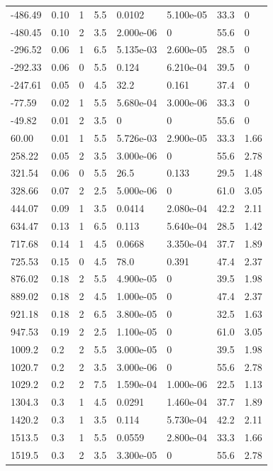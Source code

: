 \documentclass[preview]{standalone}
\begin{document}
{{\begin{tabular}{L{1.2cm}C{1.2cm} C{0.3cm}C{0.5cm} C{1.4cm}C{1.4cm} C{1.4cm}C{1.4cm}}
  -486.49  &  0.10  & 1     & 5.5 &  0.0102  & 5.100e-05  & 33.3 &  0   \\ 
  -480.45  &  0.10  & 2     & 3.5 &  2.000e-06  & 0  & 55.6 &  0   \\ 
  -296.52  &  0.06  & 1     & 6.5 &  5.135e-03  & 2.600e-05  & 28.5 &  0   \\ 
  -292.33  &  0.06  & 0     & 5.5 &  0.124  & 6.210e-04  & 39.5 &  0   \\ 
  -247.61  &  0.05  & 0     & 4.5 &  32.2  & 0.161  & 37.4 &  0   \\ 
  -77.59  &  0.02  & 1     & 5.5 &  5.680e-04  & 3.000e-06  & 33.3 &  0   \\ 
  -49.82  &  0.01  & 2     & 3.5 &  0  & 0  & 55.6 &  0   \\ 
  60.00  &  0.01  & 1     & 5.5 &  5.726e-03  & 2.900e-05  & 33.3 &  1.66   \\ 
  258.22  &  0.05  & 2     & 3.5 &  3.000e-06  & 0  & 55.6 &  2.78   \\ 
  321.54  &  0.06  & 0     & 5.5 &  26.5  & 0.133  & 29.5 &  1.48   \\ 
  328.66  &  0.07  & 2     & 2.5 &  5.000e-06  & 0  & 61.0 &  3.05   \\ 
  444.07  &  0.09  & 1     & 3.5 &  0.0414  & 2.080e-04  & 42.2 &  2.11   \\ 
  634.47  &  0.13  & 1     & 6.5 &  0.113  & 5.640e-04  & 28.5 &  1.42   \\ 
  717.68  &  0.14  & 1     & 4.5 &  0.0668  & 3.350e-04  & 37.7 &  1.89   \\ 
  725.53  &  0.15  & 0     & 4.5 &  78.0  & 0.391  & 47.4 &  2.37   \\ 
  876.02  &  0.18  & 2     & 5.5 &  4.900e-05  & 0  & 39.5 &  1.98   \\ 
  889.02  &  0.18  & 2     & 4.5 &  1.000e-05  & 0  & 47.4 &  2.37   \\ 
  921.18  &  0.18  & 2     & 6.5 &  3.800e-05  & 0  & 32.5 &  1.63   \\ 
  947.53  &  0.19  & 2     & 2.5 &  1.100e-05  & 0  & 61.0 &  3.05   \\ 
  1009.2  &   0.2  & 2     & 5.5 &  3.000e-05  & 0  & 39.5 &  1.98   \\ 
  1020.7  &   0.2  & 2     & 3.5 &  3.000e-06  & 0  & 55.6 &  2.78   \\ 
  1029.2  &   0.2  & 2     & 7.5 &  1.590e-04  & 1.000e-06  & 22.5 &  1.13   \\ 
  1304.3  &   0.3  & 1     & 4.5 &  0.0291  & 1.460e-04  & 37.7 &  1.89   \\ 
  1420.2  &   0.3  & 1     & 3.5 &  0.114  & 5.730e-04  & 42.2 &  2.11   \\ 
  1513.5  &   0.3  & 1     & 5.5 &  0.0559  & 2.800e-04  & 33.3 &  1.66   \\ 
  1519.5  &   0.3  & 2     & 3.5 &  3.300e-05  & 0  & 55.6 &  2.78   \\ 
\hline 
\end{tabular} 

}}
\end{document}
